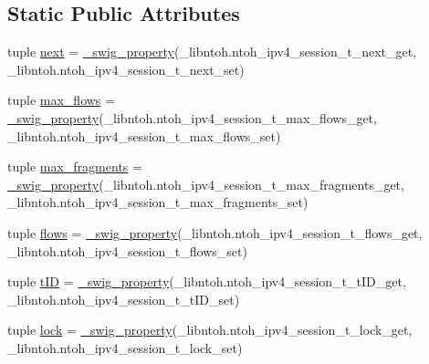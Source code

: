 \subsection*{Static Public Attributes}
\begin{DoxyCompactItemize}
\item 
tuple \hyperlink{classlibntoh_1_1ntoh__ipv4__session__t_a84e6dac37062f5a539ece8248c8567cc}{next} = \hyperlink{namespacelibntoh_ae6f5626f776538e0cdb00e75ca1c96c9}{\-\_\-swig\-\_\-property}(\-\_\-libntoh.\-ntoh\-\_\-ipv4\-\_\-session\-\_\-t\-\_\-next\-\_\-get, \-\_\-libntoh.\-ntoh\-\_\-ipv4\-\_\-session\-\_\-t\-\_\-next\-\_\-set)
\item 
tuple \hyperlink{classlibntoh_1_1ntoh__ipv4__session__t_af05028fd588ff1bc962a8a89057a3716}{max\-\_\-flows} = \hyperlink{namespacelibntoh_ae6f5626f776538e0cdb00e75ca1c96c9}{\-\_\-swig\-\_\-property}(\-\_\-libntoh.\-ntoh\-\_\-ipv4\-\_\-session\-\_\-t\-\_\-max\-\_\-flows\-\_\-get, \-\_\-libntoh.\-ntoh\-\_\-ipv4\-\_\-session\-\_\-t\-\_\-max\-\_\-flows\-\_\-set)
\item 
tuple \hyperlink{classlibntoh_1_1ntoh__ipv4__session__t_aae26317f4443b9f0f36780fb035d1ec9}{max\-\_\-fragments} = \hyperlink{namespacelibntoh_ae6f5626f776538e0cdb00e75ca1c96c9}{\-\_\-swig\-\_\-property}(\-\_\-libntoh.\-ntoh\-\_\-ipv4\-\_\-session\-\_\-t\-\_\-max\-\_\-fragments\-\_\-get, \-\_\-libntoh.\-ntoh\-\_\-ipv4\-\_\-session\-\_\-t\-\_\-max\-\_\-fragments\-\_\-set)
\item 
tuple \hyperlink{classlibntoh_1_1ntoh__ipv4__session__t_afca3cb4196e6410df799227741f11b5e}{flows} = \hyperlink{namespacelibntoh_ae6f5626f776538e0cdb00e75ca1c96c9}{\-\_\-swig\-\_\-property}(\-\_\-libntoh.\-ntoh\-\_\-ipv4\-\_\-session\-\_\-t\-\_\-flows\-\_\-get, \-\_\-libntoh.\-ntoh\-\_\-ipv4\-\_\-session\-\_\-t\-\_\-flows\-\_\-set)
\item 
tuple \hyperlink{classlibntoh_1_1ntoh__ipv4__session__t_aa8af5c32a2a96a7fe7e14b7ebd2057ba}{t\-I\-D} = \hyperlink{namespacelibntoh_ae6f5626f776538e0cdb00e75ca1c96c9}{\-\_\-swig\-\_\-property}(\-\_\-libntoh.\-ntoh\-\_\-ipv4\-\_\-session\-\_\-t\-\_\-t\-I\-D\-\_\-get, \-\_\-libntoh.\-ntoh\-\_\-ipv4\-\_\-session\-\_\-t\-\_\-t\-I\-D\-\_\-set)
\item 
tuple \hyperlink{classlibntoh_1_1ntoh__ipv4__session__t_a871c7bf899334194698c2a3bced5e064}{lock} = \hyperlink{namespacelibntoh_ae6f5626f776538e0cdb00e75ca1c96c9}{\-\_\-swig\-\_\-property}(\-\_\-libntoh.\-ntoh\-\_\-ipv4\-\_\-session\-\_\-t\-\_\-lock\-\_\-get, \-\_\-libntoh.\-ntoh\-\_\-ipv4\-\_\-session\-\_\-t\-\_\-lock\-\_\-set)
\end{DoxyCompactItemize}


